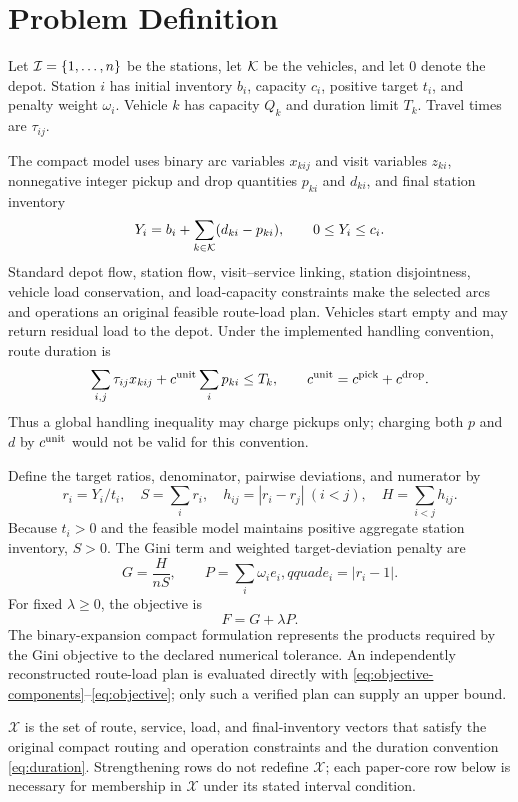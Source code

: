 \section{Problem Definition}
Let $\mathcal{I}=\{1,\ldots,n\}$ be the stations, let $\mathcal{K}$ be the vehicles, and let
$0$ denote the depot.  Station $i$ has initial inventory $b_i$, capacity
$c_i$, positive target $t_i$, and penalty weight $\omega_i$.  Vehicle $k$ has
capacity $Q_k$ and duration limit $T_k$.  Travel times are $\tau_{ij}$.

The compact model uses binary arc variables $x_{kij}$ and visit variables
$z_{ki}$, nonnegative integer pickup and drop quantities $p_{ki}$ and
$d_{ki}$, and final station inventory
\begin{equation}
  Y_i=b_i+\sum_{k\in\mathcal{K}}(d_{ki}-p_{ki}),\qquad 0\leq Y_i\leq c_i.
  \label{eq:inventory}
\end{equation}
Standard depot flow, station flow, visit--service linking, station
disjointness, vehicle load conservation, and load-capacity constraints make
the selected arcs and operations an original feasible route-load plan.
Vehicles start empty and may return residual load to the depot.  Under the
implemented handling convention, route duration is
\begin{equation}
  \sum_{i,j}\tau_{ij}x_{kij}
  +c^{\rm unit}\sum_i p_{ki}\leq T_k,
  \qquad c^{\rm unit}=c^{\rm pick}+c^{\rm drop}.
  \label{eq:duration}
\end{equation}
Thus a global handling inequality may charge pickups only; charging both
$p$ and $d$ by $c^{\rm unit}$ would not be valid for this convention.

Define the target ratios, denominator, pairwise deviations, and numerator by
\begin{equation}
 r_i=Y_i/t_i,\quad S=\sum_i r_i,\quad
 h_{ij}=|r_i-r_j|\ (i<j),\quad H=\sum_{i<j}h_{ij}.
\end{equation}
Because $t_i>0$ and the feasible model maintains positive aggregate station
inventory, $S>0$.  The Gini term \cite{gini1912} and weighted
target-deviation penalty are
\begin{equation}
 G=\frac{H}{nS},\qquad
 P=\sum_i\omega_i e_i,qquad e_i=|r_i-1|.
 \label{eq:objective-components}
\end{equation}
For fixed $\lambda\geq0$, the objective is
\begin{equation}
 F=G+\lambda P. \label{eq:objective}
\end{equation}
The binary-expansion compact formulation represents the products required by
the Gini objective to the declared numerical tolerance.  An independently
reconstructed route-load plan is evaluated directly with
\eqref{eq:objective-components}--\eqref{eq:objective}; only such a verified
plan can supply an upper bound.

\begin{definition}
$\mathcal X$ is the set of route, service, load, and final-inventory vectors
that satisfy the original compact routing and operation constraints and the
duration convention \eqref{eq:duration}.  Strengthening rows do not redefine
$\mathcal X$; each paper-core row below is necessary for membership in
$\mathcal X$ under its stated interval condition.
\end{definition}
